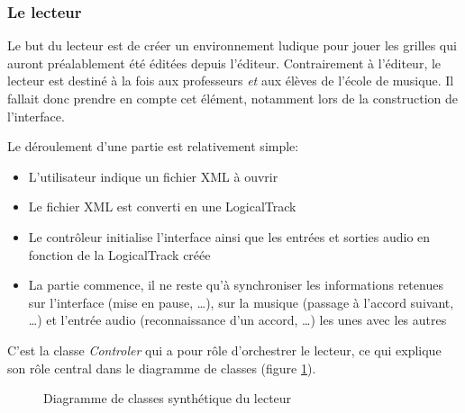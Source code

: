 \documentclass[a4paper,11pt]{article}
\begin{document}
\subsubsection{Le lecteur}

Le but du lecteur est de créer un environnement ludique pour jouer les grilles qui auront préalablement été éditées depuis l'éditeur. Contrairement à l'éditeur, le lecteur est destiné à la fois aux professeurs \textit{et} aux élèves de l'école de musique. Il fallait donc prendre en compte cet élément, notamment lors de la construction de l'interface.

Le déroulement d'une partie est relativement simple:
\begin{itemize}
 \item L'utilisateur indique un fichier XML à ouvrir
 \item Le fichier XML est converti en une LogicalTrack
 \item Le contrôleur initialise l'interface ainsi que les entrées et sorties audio en fonction de la LogicalTrack créée
 \item La partie commence, il ne reste qu'à synchroniser les informations retenues sur l'interface (mise en pause, \dots), sur la musique (passage à l'accord suivant, \dots) et l'entrée audio (reconnaissance d'un accord, \dots) les unes avec les autres
\end{itemize}

C'est la classe \textit{Controler} qui a pour rôle d'orchestrer le lecteur, ce qui explique son rôle central dans le diagramme de classes (figure \ref{diag_player}).

\begin{figure}[H]
\begin{center}
\caption{Diagramme de classes synthétique du lecteur}
\label{diag_player}
\end{center}
\end{figure}
\end{document}
